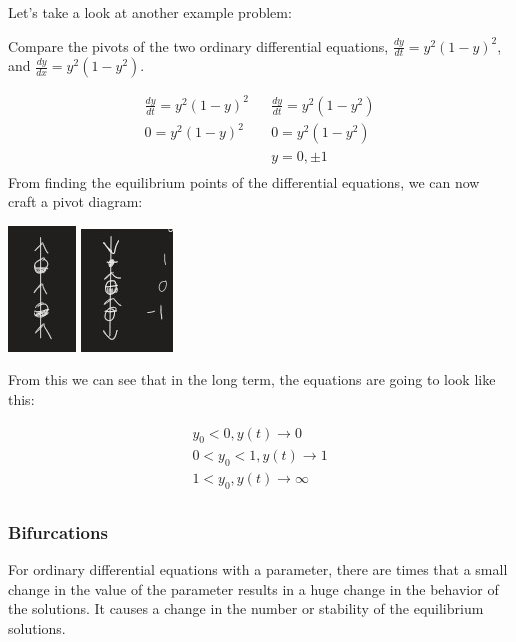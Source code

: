   Let's take a look at another example problem:

  \begin{problem}
    Compare the pivots of the two ordinary differential equations, $\frac{dy}{dt}=y^2(1-y)^2$, and $\frac{dy}{dx}=y^2(1-y^2)$.

    \begin{align*}
      \frac{dy}{dt}=y^2(1-y)^2 && \frac{dy}{dt}=y^2(1-y^2)\\
      0=y^2(1-y)^2 && 0=y^2(1-y^2)\\
      && y=0,\pm1\\
    \end{align*}
    From finding the equilibrium points of the differential equations, we can now craft a pivot diagram:\newline
    \begin{center}
    \includegraphics{resource/images/2.7 Example 2-1.jpg}
    \includegraphics{resource/images/2.7 Example 2-2.jpg}
    \end{center}

    From this we can see that in the long term, the equations are going to look like this:

    \begin{align*}
      y_0<0,y(t)\to0\\
      0<y_0<1,y(t)\to1\\
      1<y_0,y(t)\to\infty\\
    \end{align*}
  \end{problem}

  \subsubsection{Bifurcations}

  For ordinary differential equations with a parameter, there are times that a small change in the value of the parameter results in a huge change in the behavior of the solutions. It causes a change in the number or stability of the equilibrium solutions.

